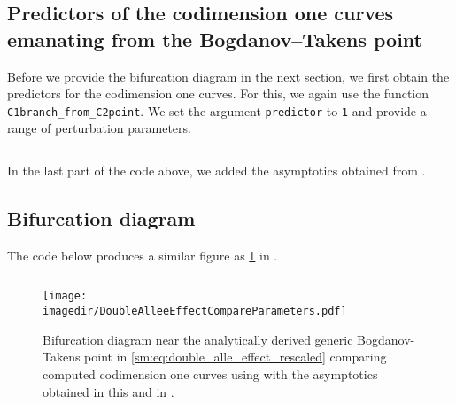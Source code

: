 \subsection{Predictors of the codimension one curves emanating from the Bogdanov--Takens point}
Before we provide the bifurcation diagram in the next section, we first obtain
the predictors for the codimension one curves. For this, we again use the
function \texttt{C1branch_from_C2point}. We set the argument
\texttt{predictor} to \texttt{1} and provide a range of
perturbation parameters.
\inputminted[firstline=118, lastline=137]{MATLAB}{\pathToDDEBifToolDemos/predator_prey/predator_prey.m}
In the last part of the code above, we added the asymptotics obtained from \cite{Jiao2021}.

\subsection{Bifurcation diagram}
The code below produces a similar figure as \cref{sm:fig:DoubleAlleeEffectCompareParameters} in \MATLAB.
\inputminted[firstline=139, lastline=164]{MATLAB}{\pathToDDEBifToolDemos/predator_prey/predator_prey.m}
%
\begin{figure}[ht]
    \centering
    \texttt{[image: \\imagedir/DoubleAlleeEffectCompareParameters.pdf]}
    \caption{Bifurcation diagram near the analytically derived generic Bogdanov-Takens point in
        \cref{sm:eq:double_alle_effect_rescaled} comparing computed codimension one
    curves using \DDEBIFTOOL with the asymptotics obtained in this \paper{} and in \cite{Jiao2021}.}
    \label{sm:fig:DoubleAlleeEffectCompareParameters}
\end{figure}

